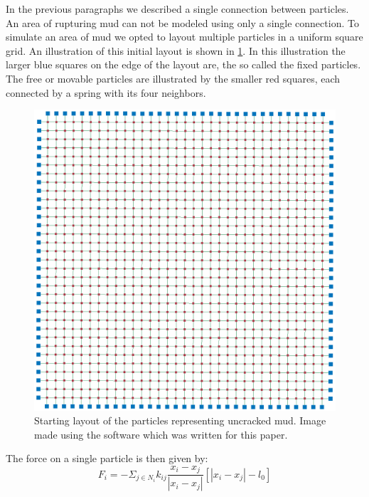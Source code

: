 
In the previous paragraphs we described a single connection between particles. An area of rupturing mud can not be modeled using only a single connection. To simulate an area of mud we opted to layout multiple particles in a uniform square grid. An illustration of this initial layout is shown in \cref{fig:model:layout}. In this illustration the larger blue squares on the edge of the layout are, the so called the fixed particles. The free or movable particles are illustrated by the smaller red squares, each connected by a spring with its four neighbors. 
%
\begin{figure}
	\centering
	\includegraphics[width=0.9\columnwidth]{img/uniform_square_grid.png}
	\caption{Starting layout of the particles representing uncracked mud. Image made using the software which was written for this paper.}
	\label{fig:model:layout}
\end{figure}
%
The force on a single particle is then given by:
%
\begin{equation}\label{eq:single:force}
	F_i = - \Sigma_{j \in N_i} k_{ij} \frac{x_i - x_j}{|x_i - x_j|}[|x_i - x_j| - l_0]
\end{equation}
